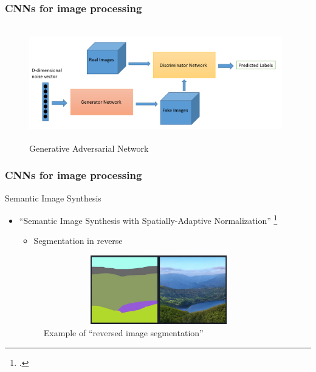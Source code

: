 \documentclass[18pt]{beamer}
\begin{document}
\begin{frame}
  \frametitle{CNNs for image processing}
  \begin{center}
    \begin{figure}[htb]
      \includegraphics[width=11cm,height=5cm]{images/gan}
      \caption{Generative Adversarial Network\footnotemark}
    \end{figure}
  \end{center}
\end{frame}

\begin{frame}
  \frametitle{CNNs for image processing}
  Semantic Image Synthesis
  \begin{itemize}
  \item ``Semantic Image Synthesis with Spatially-Adaptive Normalization'' \footcite{park2019}
    \begin{itemize}
      \item Segmentation in reverse
    \end{itemize}

    \begin{center}
      \begin{figure}[htb]
        \includegraphics[width=10cm,height=3cm]{images/gaugan}
        \caption{Example of ``reversed image segmentation''}
      \end{figure}
  \end{center}
  \end{itemize}
\end{frame}
\end{document}
